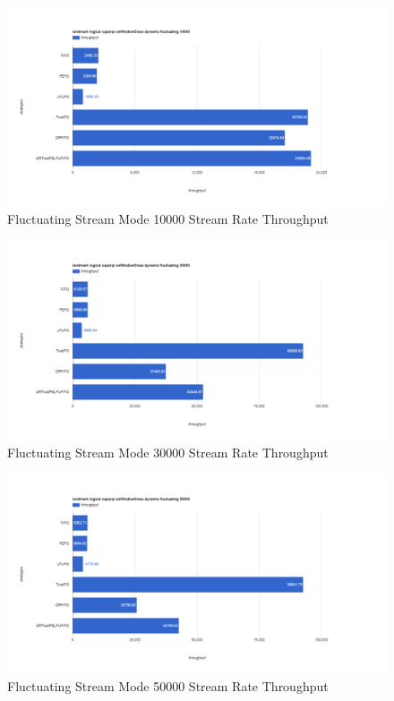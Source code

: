 \begin{figure}[!htbp]
    \centering
    \includegraphics[width=\textwidth]{img/app3-f-10000-t.png}
    \caption{Fluctuating Stream Mode 10000 Stream Rate Throughput}
\end{figure}
\begin{figure}[!htbp]
    \centering
    \includegraphics[width=\textwidth]{img/app3-f-30000-t.png}
    \caption{Fluctuating Stream Mode 30000 Stream Rate Throughput}
\end{figure}
\begin{figure}[!htbp]
    \centering
    \includegraphics[width=\textwidth]{img/app3-f-50000-t.png}
    \caption{Fluctuating Stream Mode 50000 Stream Rate Throughput}
\end{figure}
